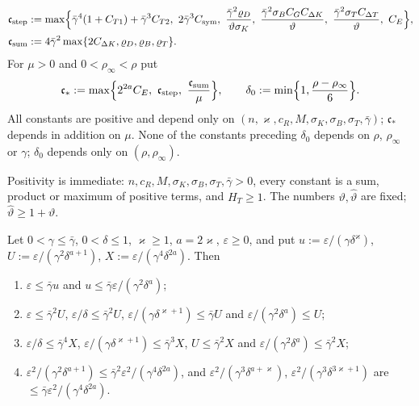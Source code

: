 \begin{definition}[Constants]
\begin{align*}
\mathfrak c_{\mathrm{step}}&:=\max\Bigl\{\bar\gamma^4(1+C_{T1})+\bar\gamma^3C_{T2},\ 2\bar\gamma^3C_{\mathrm{sym}},\
  \frac{\bar\gamma^2\varrho_D}{\vartheta\sigma_K},\ \frac{\bar\gamma^2\sigma_BC_G
  C_{\Delta K}}\vartheta,\ \frac{\bar\gamma^2\sigma_TC_{\Delta T}}\vartheta,\ C_E\Bigr\},\\
\mathfrak c_{\mathrm{sum}}&:=4\bar\gamma^2\max\{2C_{\Delta K},\varrho_D,\varrho_B,\varrho_T\}.
\end{align*}
For $\mu>0$ and $0<\rho_\infty<\rho$ put
\[
\mathfrak c_*:=\max\Bigl\{2^{2a}C_E,\ \mathfrak c_{\mathrm{step}},\ \frac{\mathfrak c_{\mathrm{sum}}}\mu\Bigr\},
\qquad\delta_0:=\min\Bigl\{1,\frac{\rho-\rho_\infty}6\Bigr\}.
\]
All constants are positive and depend only on $(n,\varkappa,c_R,M,\sigma_K,\sigma_B,\sigma_T,\bar\gamma)$;
$\mathfrak c_*$ depends in addition on $\mu$. None of the constants preceding $\delta_0$ depends on $\rho$, $\rho_\infty$ or
$\gamma$; $\delta_0$ depends only on $(\rho,\rho_\infty)$.
\end{definition}

Positivity is immediate: $n,c_R,M,\sigma_K,\sigma_B,\sigma_T,\bar\gamma>0$, every constant is a sum, product or maximum
of positive terms, and $H_T\ge1$. The numbers $\vartheta,\hat\vartheta$ are fixed; $\hat\vartheta\ge1+\vartheta$.

\begin{lemma}[Absorption]\label{bp:p2s:absorb}
Let $0<\gamma\le\bar\gamma$, $0<\delta\le1$, $\varkappa\ge1$, $a=2\varkappa$, $\varepsilon\ge0$, and put
$u:=\varepsilon/(\gamma\delta^\varkappa)$, $U:=\varepsilon/(\gamma^2\delta^{a+1})$, $X:=\varepsilon/(\gamma^4\delta^{2a})$.
Then
\begin{enumerate}[label=(\alph*)]
\item $\varepsilon\le\bar\gamma u$ and $u\le\bar\gamma\varepsilon/(\gamma^2\delta^a)$;
\item $\varepsilon\le\bar\gamma^2U$, $\varepsilon/\delta\le\bar\gamma^2U$, $\varepsilon/(\gamma\delta^{\varkappa+1})\le\bar\gamma U$ and
  $\varepsilon/(\gamma^2\delta^a)\le U$;
\item $\varepsilon/\delta\le\bar\gamma^4X$, $\varepsilon/(\gamma\delta^{\varkappa+1})\le\bar\gamma^3X$, $U\le\bar\gamma^2X$ and
  $\varepsilon/(\gamma^2\delta^a)\le\bar\gamma^2X$;
\item $\varepsilon^2/(\gamma^2\delta^{a+1})\le\bar\gamma^2\varepsilon^2/(\gamma^4\delta^{2a})$, and
  $\varepsilon^2/(\gamma^3\delta^{a+\varkappa})$, $\varepsilon^2/(\gamma^3\delta^{3\varkappa+1})$ are
  $\le\bar\gamma\varepsilon^2/(\gamma^4\delta^{2a})$.
\end{enumerate}
\end{lemma}

